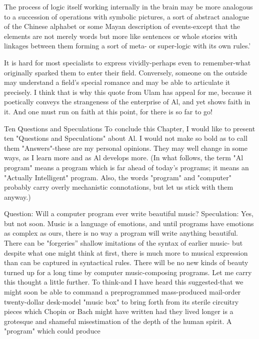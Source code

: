    The process of logic itself working internally in the brain may be more analogous
   to a succession of operations with symbolic pictures, a sort of abstract analogue of
   the Chinese alphabet or some Mayan description of events-except that the
   elements are not merely words but more like sentences or whole stories with
   linkages between them forming a sort of meta- or super-logic with its own rules.'

        It is hard for most specialists to express vividly-perhaps even to remember-what
originally sparked them to enter their field. Conversely, someone on the outside may
understand a field's special romance and may be able to articulate it precisely. I think that
is why this quote from Ulam has appeal for me, because it poetically conveys the
strangeness of the enterprise of Al, and yet shows faith in it. And one must run on faith at
this point, for there is so far to go!

                         Ten Questions and Speculations
To conclude this Chapter, I would like to present ten "Questions and Speculations" about
Al. I would not make so bold as to call them "Answers"-these are my personal opinions.
They may well change in some ways, as I learn more and as Al develops more. (In what
follows, the term "Al program" means a program which is far ahead of today's programs;
it means an "Actually Intelligent" program. Also, the words "program" and "computer"
probably carry overly mechanistic connotations, but let us stick with them anyway.)

Question: Will a computer program ever write beautiful music?
 Speculation: Yes, but not soon. Music is a language of emotions, and until programs
    have emotions as complex as ours, there is no way a program will write anything
    beautiful. There can be "forgeries” shallow imitations of the syntax of earlier music-
    but despite what one might think at first, there is much more to musical expression
    than can be captured in syntactical rules. There will be no new kinds of beauty
    turned up for a long time by computer music-composing programs. Let me carry this
    thought a little further. To think-and I have heard this suggested-that we might soon
    be able to command a preprogrammed mass-produced mail-order twenty-dollar
    desk-model "music box" to bring forth from its sterile circuitry pieces which Chopin
    or Bach might have written had they lived longer is a grotesque and shameful
    misestimation of the depth of the human spirit. A "program" which could produce


